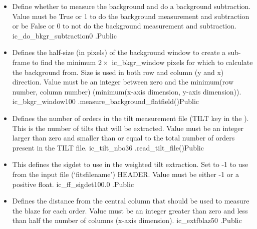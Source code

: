 \begin{itemize}

\item {}
{Define whether to measure the background and do a background subtraction. Value must be True or 1 to do the background measurement and subtraction or be False or 0 to not do the background measurement and subtraction.}
{ic\_do\_bkgr\_subtraction}{0}
{\calFFraw}{\constantsfile}{\calFFraw.\progMAIN}{Public}


\item {}
{Defines the half-size (in pixels) of the background window to create a sub-frame to find the minimum $2\times$ ic\_bkgr\_window pixels for which to calculate the background from. Size is used in both row and column (y and x) direction. Value must be an integer between zero and the minimum(row number, column number) (minimum(x-axis dimension, y-axis dimension)).}
{ic\_bkgr\_window}{100}
{\calFFraw}{\constantsfile}{\spirouBACK.measure\_background\_flatfield()}{Public}


\item {}
{Defines the number of orders in the tilt measurement file (TILT key in the \masterCALIBDBfile). This is the number of tilts that will be extracted. Value must be an integer larger than zero and smaller than or equal to the total number of orders present in the TILT file.}
{ic\_tilt\_nbo}{36}
{\calFFraw}{\constantsfile}{\spirouFITS.read\_tilt\_file()}{Public}


\item {}
{This defines the sigdet to use in the weighted tilt extraction. Set to -1 to use from the input file (`fitsfilename') HEADER. Value must be either -1 or a positive float.}
{ic\_ff\_sigdet}{100.0}
{\calFFraw}{\constantsfile}{\calFFraw.\progMAIN}{Public}


\item {}
{Defines the distance from the central column that should be used to measure the blaze for each order. Value must be an integer greater than zero and less than half the number of columns (x-axis dimension).}
{ic\_extfblaz}{50}
{\calFFraw}{\constantsfile}{\calFFraw.\progMAIN}{Public}



\end{itemize}
